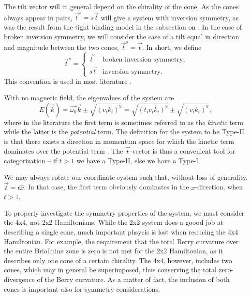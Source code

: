 The tilt vector will in general depend on the chirality of the cone.
As the cones always appear in pairs, \( \vec{t}^s = s \vec{t} \) will give a system with inversion symmetry, as was the result from the tight binding model in the subsection on \emph{}.
In the case of broken inversion symmetry, we will consider the case of a tilt equal in direction and magnitude between the two cones, \( \vec{t}^s = \vec{t} \).
In short, we define
\begin{equation}
  \vec{t}^s =
  \begin{cases}
    \vec{t} & \text{broken inversion symmetry},\\
    s \vec{t} & \text{inversion symmetry}.
  \end{cases}\label{eq:11}
\end{equation}
This convention is used in most literature \cite{vanderwurffMagnetovorticalThermoelectricTransport2019,ferreirosAnomalousNernstThermal2017}.

With no magnetic field, the eigenvalues of the system are
\begin{equation}
  \label{eq:12}
  E(\vec{k}) = \vec{\omega_{0}} \vec{k} \pm \sqrt{(v_{i} k_{i})^{2}} = \sqrt{(t_{i} v_{i} k_{i})^{2}} \pm \sqrt{(v_{i} k_{i})^{2}},
\end{equation}
where in the literature the first term is sometimes referred to as the \emph{kinetic} term while the latter is the \emph{potential} term.
The definition for the system to be Type-II is that there exists a direction in momentum space for which the kinetic term dominates over the potential term \cite{soluyanovTypeIIWeylSemimetals2015}.
The \(\vec{t}\)-vector is thus a convenient tool for categorization -- if \(t > 1\) we have a Type-II, else we have a Type-I.


\begin{Proof}
  We may always rotate our coordinate system such that, without loss of generality, \(\vec{t} = t \hat{x}\).
  In that case, the first term obviously dominates in the \(x\)-direction, when $t>1$.
\end{Proof}

To properly investigate the symmetry properties of the system, we must consider the 4x4, not 2x2 Hamiltonians.
While the 2x2 system does a goood job at describing a single cone, much important phsycis is lost when reducing the 4x4 Hamiltonian.
For example, the requirement that the total Berry curvature over the entire Briolluine zone is zero is not met for the 2x2 Hamiltonian, as it describes only one cone of a certain chirality.
The 4x4, however, includes two cones, which may in general be superimposed, thus conserving the total zero-divergence of the Berry curvature.
As a matter of fact, the inclusion of both cones is important also for symmetry considerations.

